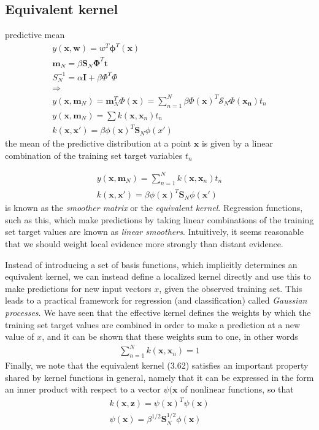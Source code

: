\documentclass[a4paper]{article}
\begin{document}
\subsection{Equivalent kernel}
predictive mean
\begin{align*}
y(\mathbf{x},\mathbf{w}) = w^T \boldsymbol{\phi}^T(\mathbf{x})\\
\mathbf{m}_N = \beta \mathbf{S}_N \boldsymbol{\Phi}^T \mathbf{t}\\
S_N^{-1} = \alpha \mathbf{I} + \beta\Phi^T\Phi\\
\Rightarrow\\
y(\mathbf{x},\mathbf{m}_N) = \mathbf{m}_N^T \Phi(\mathbf{x}) =
\displaystyle\sum_{n=1}^{N} \beta \Phi(\mathbf{x})^T \mathcal{S}_N \Phi(\mathbf{x_n}) t_n\\
y(\mathbf{x},\mathbf{m}_N) = \sum k(\mathbf{x},\mathbf{x}_n)t_n\\
k(\mathbf{x},\mathbf{x}') = \beta\phi(\mathbf{x})^T\mathbf{S}_N\phi(x')
\end{align*}
the mean of the predictive distribution at a point
$ \mathbf{x} $ is given by a linear combination of the training set target
variables $ t_n $

\begin{align}
y(\mathbf{x},\mathbf{m}_N) =
\displaystyle\sum_{n=1}^{N} k(\mathbf{x},\mathbf{x}_n) t_n
\\
 k(\mathbf{x},\mathbf{x}') = \beta \phi(\mathbf{x})^T \mathbf{S}_N \phi(\mathbf{x'})
\end{align}
is known as the \textit{smoother matrix} or the \textit{equivalent
  kernel}. Regression functions, such
as this, which make predictions by taking linear combinations of the training set
target values are known as \textit{linear smoothers}. Intuitively, it seems reasonable
that we should weight local evidence more strongly than distant evidence.

Instead of introducing a set of basis functions, which implicitly determines an equivalent kernel, we can instead define a localized kernel directly and use this to make predictions for new input vectors $x$, given the observed training set. This leads to a practical framework for regression (and classification) called \textit{Gaussian processes}.
We have seen that the effective kernel defines the weights by which the training set target values are combined in order to make a prediction at a new value of $x$, and it can be shown that these weights sum to one, in other words
\begin{align}
\displaystyle\sum_{n=1}^{N} k(\mathbf{x},\mathbf{x}_n) = 1
\end{align}
Finally, we note that the equivalent kernel (3.62) satisfies an
important property shared by kernel functions in general, namely that
it can be expressed in the form an inner product with respect to a
vector $ \psi(\mathbf{x} $ of nonlinear functions, so that
\begin{align}
k(\mathbf{x},\mathbf{z}) = \psi(\mathbf{x})^T\psi(\mathbf{x})
\\
\psi(\mathbf{x}) = \beta^{1/2} \mathbf{S}_N^{1/2} \phi(\mathbf{x})
\end{align}
\end{document}
